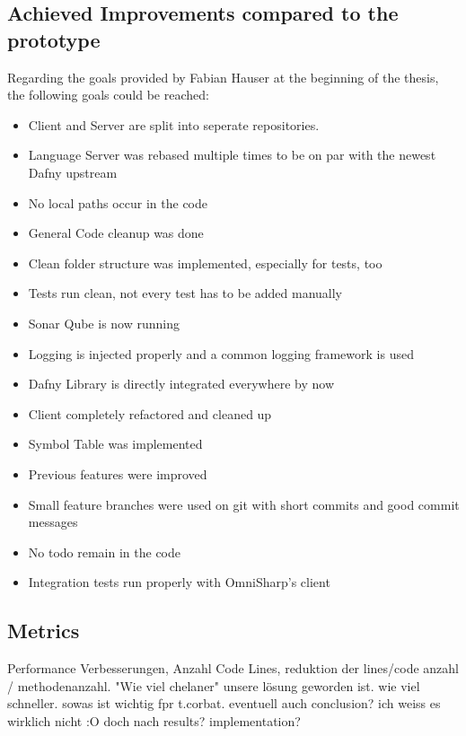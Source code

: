 \subsection{Achieved Improvements compared to the prototype}
Regarding the goals provided by Fabian Hauser at the beginning of the thesis, the following goals could be reached:
\begin{itemize}
    \item Client and Server are split into seperate repositories.
    \item Language Server was rebased multiple times to be on par with the newest Dafny upstream
    \item No local paths occur in the code
    \item General Code cleanup was done
    \item Clean folder structure was implemented, especially for tests, too
    \item Tests run clean, not every test has to be added manually
    \item Sonar Qube is now running
    \item Logging is injected properly and a common logging framework is used
    \item Dafny Library is directly integrated everywhere by now
    \item Client completely refactored and cleaned up
    \item Symbol Table was implemented
    \item Previous features were improved
    \item Small feature branches were used on git with short commits and good commit messages
    \item No todo remain in the code
    \item Integration tests run properly with OmniSharp's client
\end{itemize}


\subsection{Metrics}

Performance Verbesserungen, Anzahl Code Lines, reduktion der lines/code anzahl / methodenanzahl.
"Wie viel chelaner" unsere lösung geworden ist. wie viel schneller. sowas ist wichtig fpr t.corbat.
eventuell auch conclusion? ich weiss es wirklich nicht :O doch nach results? implementation?
